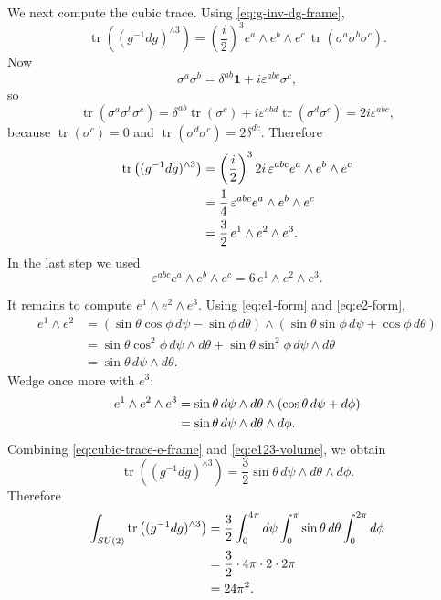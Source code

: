 \documentclass[11pt]{article}
\newcommand{\tr}{\operatorname{tr}}
\theoremstyle{definition}
\numberwithin{theorem}{section}
\numberwithin{equation}{section}
\begin{document}
\noindent We next compute the cubic trace. Using \eqref{eq:g-inv-dg-frame},
\begin{equation*}
\tr\left((g^{-1}dg)^{\wedge 3}\right)
=
\left(\frac{i}{2}\right)^3
e^a\wedge e^b\wedge e^c\,
\tr(\sigma^a\sigma^b\sigma^c).
\end{equation*}
Now
\begin{equation*}
\sigma^a\sigma^b = \delta^{ab}\mathbf{1} + i\varepsilon^{abc}\sigma^c,
\end{equation*}
so
\begin{equation*}
\tr(\sigma^a\sigma^b\sigma^c)
=
\delta^{ab}\tr(\sigma^c)
+ i\varepsilon^{abd}\tr(\sigma^d\sigma^c)
=
2i\varepsilon^{abc},
\end{equation*}
because $\tr(\sigma^c)=0$ and $\tr(\sigma^d\sigma^c)=2\delta^{dc}$. Therefore
\begin{align}
\tr\left((g^{-1}dg)^{\wedge 3}\right)
&=
\left(\frac{i}{2}\right)^3 2i\,\varepsilon^{abc}e^a\wedge e^b\wedge e^c \notag\\
&=
\frac{1}{4}\,\varepsilon^{abc}e^a\wedge e^b\wedge e^c \notag\\
&=
\frac{3}{2}\,e^1\wedge e^2\wedge e^3.
\label{eq:cubic-trace-e-frame}
\end{align}
In the last step we used
\begin{equation*}
\varepsilon^{abc}e^a\wedge e^b\wedge e^c = 6\,e^1\wedge e^2\wedge e^3.
\end{equation*}

\medskip

\noindent It remains to compute $e^1\wedge e^2\wedge e^3$. Using \eqref{eq:e1-form} and \eqref{eq:e2-form},
\begin{align*}
e^1\wedge e^2
&=
\left(\sin\theta\cos\phi\,d\psi - \sin\phi\,d\theta\right)
\wedge
\left(\sin\theta\sin\phi\,d\psi + \cos\phi\,d\theta\right) \\
&=
\sin\theta\cos^2\phi\, d\psi\wedge d\theta
+ \sin\theta\sin^2\phi\, d\psi\wedge d\theta \\
&=
\sin\theta\, d\psi\wedge d\theta.
\end{align*}
Wedge once more with $e^3$:
\begin{align}
e^1\wedge e^2\wedge e^3
&=
\sin\theta\, d\psi\wedge d\theta\wedge(\cos\theta\,d\psi + d\phi) \notag\\
&=
\sin\theta\, d\psi\wedge d\theta\wedge d\phi.
\label{eq:e123-volume}
\end{align}
Combining \eqref{eq:cubic-trace-e-frame} and \eqref{eq:e123-volume}, we obtain
\begin{equation}\label{eq:tr-gdg-cubed-euler}
\tr\left((g^{-1}dg)^{\wedge 3}\right)
=
\frac{3}{2}\sin\theta\, d\psi\wedge d\theta\wedge d\phi.
\end{equation}
Therefore
\begin{align}
\int_{SU(2)}\tr\left((g^{-1}dg)^{\wedge 3}\right)
&=
\frac{3}{2}
\int_0^{4\pi} d\psi
\int_0^\pi \sin\theta\, d\theta
\int_0^{2\pi} d\phi \notag\\
&=
\frac{3}{2}\cdot 4\pi \cdot 2 \cdot 2\pi \notag\\
&= 24\pi^2.
\label{eq:S3-integral}
\end{align}
\end{document}
